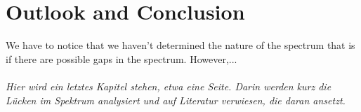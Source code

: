 \chapter{Outlook and Conclusion}	
	
We have to notice that we haven't determined the nature of the spectrum that is if there are possible gaps in the spectrum. However,... %
~\\ ~\\
{\it Hier wird ein letztes Kapitel stehen, etwa eine Seite. Darin werden kurz die Lücken im Spektrum analysiert und auf Literatur verwiesen, die daran ansetzt.}

